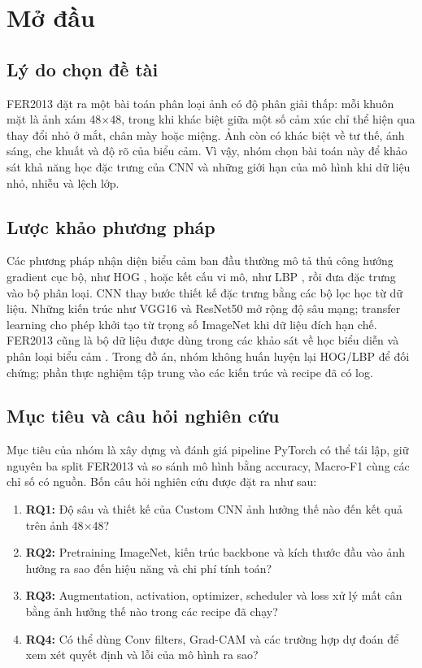 \chapter*{Mở đầu}

\section{Lý do chọn đề tài}
FER2013 đặt ra một bài toán phân loại ảnh có độ phân giải thấp: mỗi khuôn mặt là ảnh xám 48\ensuremath{\times}48, trong khi khác biệt giữa một số cảm xúc chỉ thể hiện qua thay đổi nhỏ ở mắt, chân mày hoặc miệng. Ảnh còn có khác biệt về tư thế, ánh sáng, che khuất và độ rõ của biểu cảm. Vì vậy, nhóm chọn bài toán này để khảo sát khả năng học đặc trưng của CNN và những giới hạn của mô hình khi dữ liệu nhỏ, nhiễu và lệch lớp.

\section{Lược khảo phương pháp}
Các phương pháp nhận diện biểu cảm ban đầu thường mô tả thủ công hướng gradient cục bộ, như HOG \citep{dalal2005hog}, hoặc kết cấu vi mô, như LBP \citep{ojala2002lbp}, rồi đưa đặc trưng vào bộ phân loại. CNN thay bước thiết kế đặc trưng bằng các bộ lọc học từ dữ liệu. Những kiến trúc như VGG16 và ResNet50 mở rộng độ sâu mạng; transfer learning cho phép khởi tạo từ trọng số ImageNet khi dữ liệu đích hạn chế. FER2013 cũng là bộ dữ liệu được dùng trong các khảo sát về học biểu diễn và phân loại biểu cảm \citep{goodfellow2013fer}. Trong đồ án, nhóm không huấn luyện lại HOG/LBP để đối chứng; phần thực nghiệm tập trung vào các kiến trúc và recipe đã có log.

\section{Mục tiêu và câu hỏi nghiên cứu}
Mục tiêu của nhóm là xây dựng và đánh giá pipeline PyTorch có thể tái lập, giữ nguyên ba split FER2013 và so sánh mô hình bằng accuracy, Macro-F1 cùng các chỉ số có nguồn. Bốn câu hỏi nghiên cứu được đặt ra như sau:
\begin{enumerate}
\item \textbf{RQ1:} Độ sâu và thiết kế của Custom CNN ảnh hưởng thế nào đến kết quả trên ảnh 48\ensuremath{\times}48?
\item \textbf{RQ2:} Pretraining ImageNet, kiến trúc backbone và kích thước đầu vào ảnh hưởng ra sao đến hiệu năng và chi phí tính toán?
\item \textbf{RQ3:} Augmentation, activation, optimizer, scheduler và loss xử lý mất cân bằng ảnh hưởng thế nào trong các recipe đã chạy?
\item \textbf{RQ4:} Có thể dùng Conv filters, Grad-CAM và các trường hợp dự đoán để xem xét quyết định và lỗi của mô hình ra sao?
\end{enumerate}

